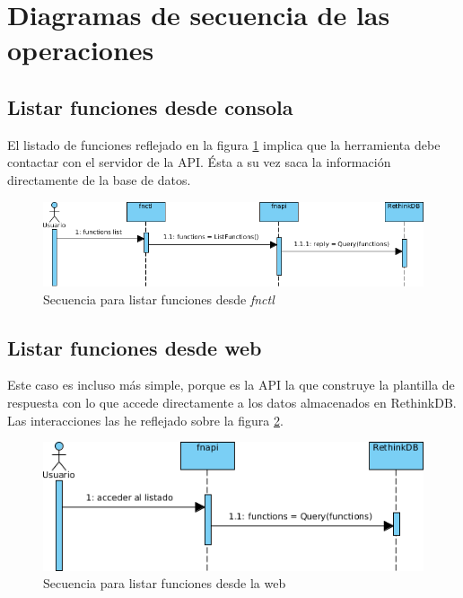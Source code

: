 \section{Diagramas de secuencia de las operaciones}

\subsection{Listar funciones desde consola}

El listado de funciones reflejado en la figura \ref{fig:sec-list} implica que la herramienta debe contactar con el servidor de la API. Ésta a su vez saca la información directamente de la base de datos.

\begin{figure}[H]
    \centering
    \includegraphics[width=\textwidth]{../images/secuencia/list-fnctl.png}
    \caption{Secuencia para listar funciones desde \emph{fnctl}}
    \label{fig:sec-list}
\end{figure}

\subsection{Listar funciones desde web}

Este caso es incluso más simple, porque es la API la que construye la plantilla de respuesta con lo que accede directamente a los datos almacenados en RethinkDB. Las interacciones las he reflejado sobre la figura \ref{fig:sec-list-web}.

\begin{figure}[H]
    \centering
    \includegraphics[width=\textwidth]{../images/secuencia/list-web.png}
    \caption{Secuencia para listar funciones desde la web}
    \label{fig:sec-list-web}
\end{figure}

